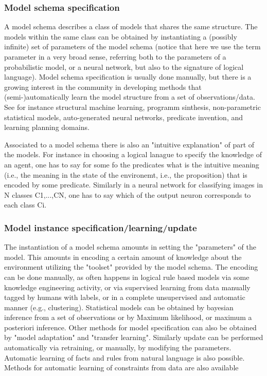 \subsubsection{Model schema specification}

A model schema describes a class of models that shares the same structure. The models within the same class can be obtained by instantiating a (possibly infinite) set of parameters of the model schema (notice that here we use the term parameter in a very broad sense, referring both to the parameters of a probabilistic model, or a neural network, but also to the signature of logical language). Model schema specification is usually done manually, but there is a growing interest in the community in developing methods that (semi-)automatically learn the model structure from a set of observations/data. See for instance structural machine learning, programm sinthesis, non-parametric statistical models, auto-generated neural networks, predicate invention, and learning planning domains.

Associated to a model schema there is also an "intuitive explanation" of part of the models. For instance in choosing a logical lanague to specify the knowledge of an agent, one has to say for some fo the predicates what is the intuitive meaning (i.e., the meaning in the state of the environemt, i.e., the proposition) that is encoded by some predicate. Similarly in a neural network for classifying images in N classes C1,...,CN, one has to say which of the output neuron corresponds to each class Ci.

\subsubsection{Model instance specification/learning/update}

The instantiation of a model schema amounts in setting the "parameters" of the model. This amounts in encoding a certain amount of knowledge about the environment utilizing the "toolset" provided by the model schema. The encoding can be done manually, as often happens in logical rule based models via some knowledge engineering activity, or via supervised learning from data manually tagged by humans with labels, or in a complete unsupervised and automatic manner (e.g., clustering). Statistical models can be obtained by bayesian inference from a set of observations or by Maximum likelihood, or maximum a posteriori inference. Other methods for model specification can also be obtained by "model adaptation" and "transfer learning". Similarly update can be performed automatically via retraining, or manually, by modifying the parameters. Automatic learning of facts and rules from natural language is also possible. Methods for automatic learning of constraints from data are also available

